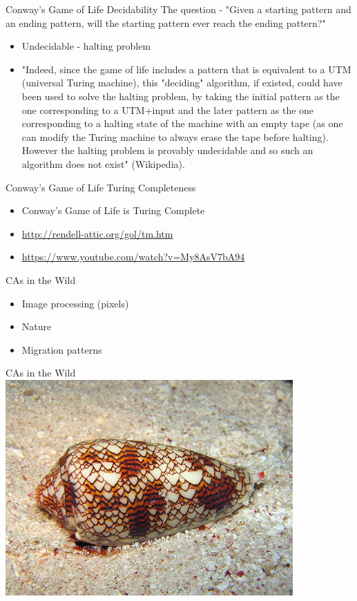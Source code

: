 \documentclass[bigger]{beamer}
\begin{document}
\begin{frame}[label=sec-20]{Conway's Game of Life Decidability}
The question - "Given a starting pattern and an ending pattern, will the starting pattern ever reach the ending pattern?"
\begin{itemize}
\item<2->Undecidable - halting problem
\item<3->"Indeed, since the game of life includes a pattern that is equivalent to a UTM (universal Turing machine), this "deciding" algorithm, if existed, could have been used to solve the halting problem, by taking the initial pattern as the one corresponding to a UTM+input and the later pattern as the one corresponding to a halting state of the machine with an empty tape (as one can modify the Turing machine to always erase the tape before halting). However the halting problem is provably undecidable and so such an algorithm does not exist" (Wikipedia).
\end{itemize}
\end{frame}
\begin{frame}[label=sec-21]{Conway's Game of Life Turing Completeness}
\begin{itemize}
\item Conway's Game of Life is Turing Complete
\item \url{http://rendell-attic.org/gol/tm.htm}
\item \url{https://www.youtube.com/watch?v=My8AsV7bA94}
\end{itemize}
\end{frame}
\begin{frame}[label=sec-22]{CAs in the Wild}
\begin{itemize}
\item<1->Image processing (pixels)
\item<2->Nature
\item<3->Migration patterns
\end{itemize}
\end{frame}
\begin{frame}[label=sec-23]{CAs in the Wild}
\includegraphics[width=11cm]{images/shell.jpg}
\end{frame}
\end{document}
